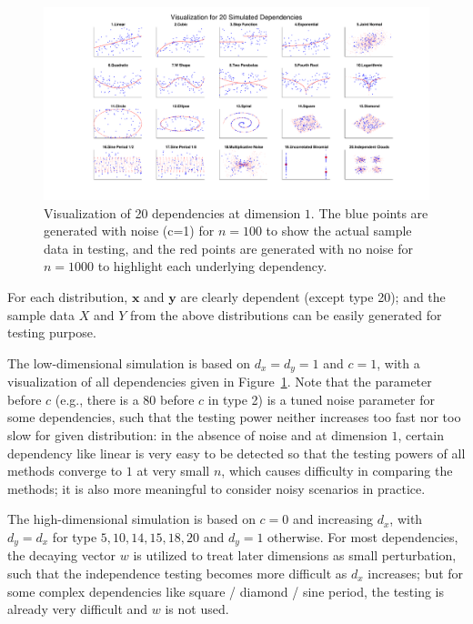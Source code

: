 \documentclass[11pt]{article}
\providecommand{\mb}[1]{\boldsymbol{#1}}
\begin{document}
\begin{figure}[htbp]
\includegraphics[trim={5cm 0 3.5cm 0},clip, width=1.0\textwidth]{../Figures/Fig0}
\caption{Visualization of 20 dependencies at dimension $1$. The blue points are generated with noise (c=1) for $n=100$ to show the actual sample data in testing, and the red points are generated with no noise for $n=1000$ to highlight each underlying dependency.
}
\label{fig0}
\end{figure}

For each distribution, $\mb{x}$ and $\mb{y}$ are clearly dependent (except type 20); and the sample data $X$ and $Y$ from the above distributions can be easily generated for testing purpose.

The low-dimensional simulation is based on $d_{x}=d_{y}=1$ and $c=1$, with a visualization of all dependencies given in Figure~\ref{fig0}. Note that the parameter before $c$ (e.g., there is a $80$ before $c$ in type 2) is a tuned noise parameter for some dependencies, such that the testing power neither increases too fast nor too slow for given distribution: in the absence of noise and at dimension $1$, certain dependency like linear is very easy to be detected so that the testing powers of all methods converge to $1$ at very small $n$, which causes difficulty in comparing the methods; it is also more meaningful to consider noisy scenarios in practice. 

The high-dimensional simulation is based on $c=0$ and increasing $d_{x}$, with $d_{y}=d_{x}$ for type $5,10,14,15,18,20$ and $d_{y}=1$ otherwise. For most dependencies, the decaying vector $w$ is utilized to treat later dimensions as small perturbation, such that the independence testing becomes more difficult as $d_{x}$ increases; but for some complex dependencies like square / diamond / sine period, the testing is already very difficult and $w$ is not used.
\end{document}
